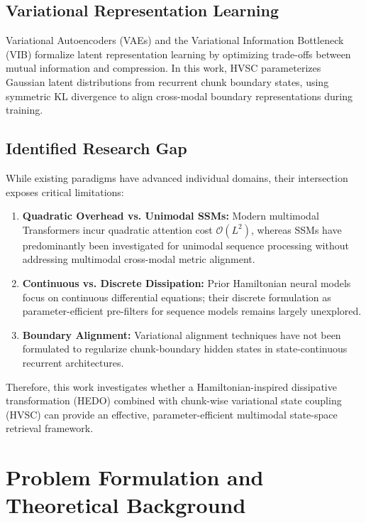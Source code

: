 \documentclass[journal]{IEEEtran}
\begin{document}
\subsection{Variational Representation Learning}
Variational Autoencoders (VAEs) \cite{kingma2013auto} and the Variational Information Bottleneck (VIB) \cite{alemi2016deep} formalize latent representation learning by optimizing trade-offs between mutual information and compression. In this work, HVSC parameterizes Gaussian latent distributions from recurrent chunk boundary states, using symmetric KL divergence to align cross-modal boundary representations during training.

\subsection{Identified Research Gap}
While existing paradigms have advanced individual domains, their intersection exposes critical limitations:
\begin{enumerate}
    \item \textbf{Quadratic Overhead vs. Unimodal SSMs:} Modern multimodal Transformers incur quadratic attention cost $\mathcal{O}(L^2)$, whereas SSMs have predominantly been investigated for unimodal sequence processing without addressing multimodal cross-modal metric alignment.
    \item \textbf{Continuous vs. Discrete Dissipation:} Prior Hamiltonian neural models focus on continuous differential equations; their discrete formulation as parameter-efficient pre-filters for sequence models remains largely unexplored.
    \item \textbf{Boundary Alignment:} Variational alignment techniques have not been formulated to regularize chunk-boundary hidden states in state-continuous recurrent architectures.
\end{enumerate}
Therefore, this work investigates whether a Hamiltonian-inspired dissipative transformation (HEDO) combined with chunk-wise variational state coupling (HVSC) can provide an effective, parameter-efficient multimodal state-space retrieval framework.

\section{Problem Formulation and Theoretical Background}
\label{sec:problem_formulation}
\end{document}
